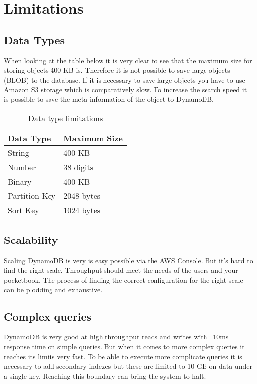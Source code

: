 \chapter{Limitations}
\section{Data Types}
When looking at the table below it is very clear to see that the maximum size for storing objects 400 KB is. Therefore it is not possible to save large objects (BLOB) to the database. If it is necessary to save large objects you have to use Amazon S3 storage which is comparatively slow. To increase the search speed it is possible to save the meta information of the object to DynamoDB.
\begin{table}[htt]
\centering
\caption{Data type limitations}
\begin{tabular}{|l|l|}
\hline
Data Type     & Maximum Size \\ \hline
String        & 400 KB       \\ \hline
Number        & 38 digits    \\ \hline
Binary        & 400 KB       \\ \hline
Partition Key & 2048 bytes   \\ \hline
Sort Key      & 1024 bytes   \\ \hline
\end{tabular}
\end{table}


\section{Scalability}
Scaling DynamoDB is very is easy possible via the AWS Console. But it's hard to find the right scale. Throughput should meet the needs of the users and your pocketbook. The process of finding the correct configuration for the right scale can be plodding and exhaustive.


\section{Complex queries}
DynamoDB is very good at high throughput reads and writes with ~10ms response time on simple queries. But when it comes to more complex queries it reaches its limits very fast. To be able to execute more complicate queries it is necessary to add secondary indexes but these are limited to 10 GB on data under a single key. Reaching this boundary can bring the system to halt.
\cite{wwwscalingdynamodb}
